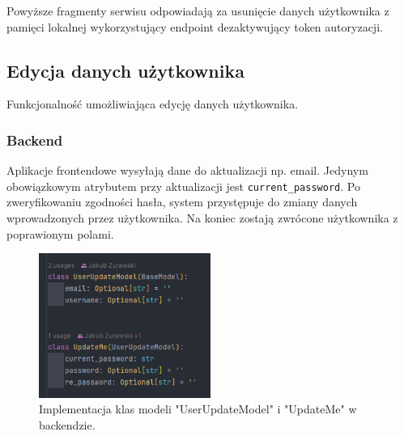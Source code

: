 Powyższe fragmenty serwisu odpowiadają za usunięcie danych użytkownika z pamięci lokalnej wykorzystujący endpoint dezaktywujący token autoryzacji.

\subsection{Edycja danych użytkownika}
Funkcjonalność umożliwiająca  edycję danych użytkownika.

\subsubsection{Backend}
Aplikacje frontendowe wysyłają dane do aktualizacji np. email. Jedynym obowiązkowym atrybutem przy aktualizacji jest \texttt{current\_password}. Po zweryfikowaniu zgodności hasła, system przystępuje do zmiany danych wprowadzonych przez użytkownika. Na koniec zostają zwrócone użytkownika z poprawionym polami.

\begin{figure}[H]
    \centering
    \includegraphics[width=0.5\textwidth]{chapters/chapter_8/screens/edit_user_backend_1}
    \caption{Implementacja klas modeli "UserUpdateModel" i "UpdateMe" w backendzie.}
    \label{img:edit_user_backend_1}
\end{figure}

